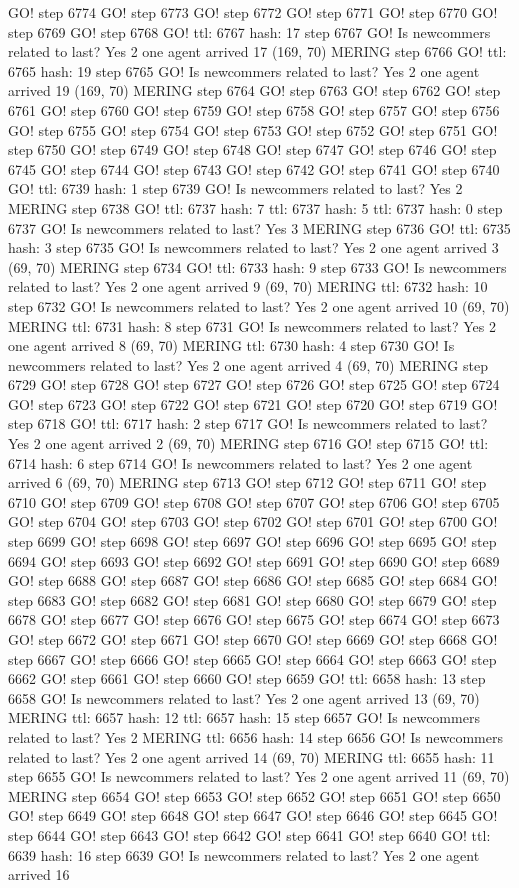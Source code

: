 GO! step 6774 GO! step 6773 GO! step 6772 GO! step 6771 GO! step 6770 GO! step 6769 GO! step 6768 GO! ttl: 6767 hash: 17 step 6767 GO! Is newcommers related to last? Yes 2 one agent arrived 17 (169, 70) MERING step 6766 GO! ttl: 6765 hash: 19 step 6765 GO! Is newcommers related to last? Yes 2 one agent arrived 19 (169, 70) MERING step 6764 GO! step 6763 GO! step 6762 GO! step 6761 GO! step 6760 GO! step 6759 GO! step 6758 GO! step 6757 GO! step 6756 GO! step 6755 GO! step 6754 GO! step 6753 GO! step 6752 GO! step 6751 GO! step 6750 GO! step 6749 GO! step 6748 GO! step 6747 GO! step 6746 GO! step 6745 GO! step 6744 GO! step 6743 GO! step 6742 GO! step 6741 GO! step 6740 GO! ttl: 6739 hash: 1 step 6739 GO! Is newcommers related to last? Yes 2 MERING step 6738 GO! ttl: 6737 hash: 7 ttl: 6737 hash: 5 ttl: 6737 hash: 0 step 6737 GO! Is newcommers related to last? Yes 3 MERING step 6736 GO! ttl: 6735 hash: 3 step 6735 GO! Is newcommers related to last? Yes 2 one agent arrived 3 (69, 70) MERING step 6734 GO! ttl: 6733 hash: 9 step 6733 GO! Is newcommers related to last? Yes 2 one agent arrived 9 (69, 70) MERING ttl: 6732 hash: 10 step 6732 GO! Is newcommers related to last? Yes 2 one agent arrived 10 (69, 70) MERING ttl: 6731 hash: 8 step 6731 GO! Is newcommers related to last? Yes 2 one agent arrived 8 (69, 70) MERING ttl: 6730 hash: 4 step 6730 GO! Is newcommers related to last? Yes 2 one agent arrived 4 (69, 70) MERING step 6729 GO! step 6728 GO! step 6727 GO! step 6726 GO! step 6725 GO! step 6724 GO! step 6723 GO! step 6722 GO! step 6721 GO! step 6720 GO! step 6719 GO! step 6718 GO! ttl: 6717 hash: 2 step 6717 GO! Is newcommers related to last? Yes 2 one agent arrived 2 (69, 70) MERING step 6716 GO! step 6715 GO! ttl: 6714 hash: 6 step 6714 GO! Is newcommers related to last? Yes 2 one agent arrived 6 (69, 70) MERING step 6713 GO! step 6712 GO! step 6711 GO! step 6710 GO! step 6709 GO! step 6708 GO! step 6707 GO! step 6706 GO! step 6705 GO! step 6704 GO! step 6703 GO! step 6702 GO! step 6701 GO! step 6700 GO! step 6699 GO! step 6698 GO! step 6697 GO! step 6696 GO! step 6695 GO! step 6694 GO! step 6693 GO! step 6692 GO! step 6691 GO! step 6690 GO! step 6689 GO! step 6688 GO! step 6687 GO! step 6686 GO! step 6685 GO! step 6684 GO! step 6683 GO! step 6682 GO! step 6681 GO! step 6680 GO! step 6679 GO! step 6678 GO! step 6677 GO! step 6676 GO! step 6675 GO! step 6674 GO! step 6673 GO! step 6672 GO! step 6671 GO! step 6670 GO! step 6669 GO! step 6668 GO! step 6667 GO! step 6666 GO! step 6665 GO! step 6664 GO! step 6663 GO! step 6662 GO! step 6661 GO! step 6660 GO! step 6659 GO! ttl: 6658 hash: 13 step 6658 GO! Is newcommers related to last? Yes 2 one agent arrived 13 (69, 70) MERING ttl: 6657 hash: 12 ttl: 6657 hash: 15 step 6657 GO! Is newcommers related to last? Yes 2 MERING ttl: 6656 hash: 14 step 6656 GO! Is newcommers related to last? Yes 2 one agent arrived 14 (69, 70) MERING ttl: 6655 hash: 11 step 6655 GO! Is newcommers related to last? Yes 2 one agent arrived 11 (69, 70) MERING step 6654 GO! step 6653 GO! step 6652 GO! step 6651 GO! step 6650 GO! step 6649 GO! step 6648 GO! step 6647 GO! step 6646 GO! step 6645 GO! step 6644 GO! step 6643 GO! step 6642 GO! step 6641 GO! step 6640 GO! ttl: 6639 hash: 16 step 6639 GO! Is newcommers related to last? Yes 2 one agent arrived 16 